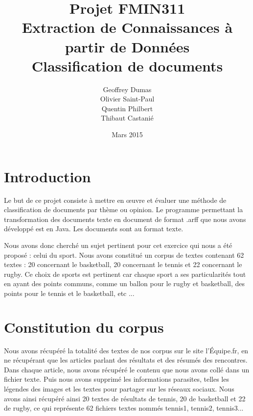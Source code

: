\documentclass[a4paper,11pt]{article}
\begin{document}
\title{Projet FMIN311\\Extraction de Connaissances à partir de Données\\\textbf{Classification de documents}}
\author{Geoffrey Dumas\\Olivier Saint-Paul\\Quentin Philbert\\Thibaut Castanié}
\date{Mars 2015}

\maketitle
\thispagestyle{empty}

\newpage


\setcounter{page}{1}
\tableofcontents

\newpage

\section{Introduction}
Le but de ce projet consiste à mettre en œuvre et évaluer une méthode de classification de documents par thème ou opinion. Le programme  permettant la transformation des documents texte en document de format .arff que nous avons développé est en Java. Les documents sont au format texte.

Nous avons donc cherché un sujet pertinent pour cet exercice qui nous a été proposé : celui du sport. Nous avons constitué un corpus de textes contenant 62 textes : 20 concernant le basketball, 20 concernant le tennis et 22 concernant le rugby. Ce choix de sports est pertinent car chaque sport a ses particularités tout en ayant des points communs, comme un ballon pour le rugby et basketball, des points pour le tennis et le basketball, etc ...

\newpage

\section{Constitution du corpus}
Nous avons récupéré la totalité des textes de nos corpus sur le site l’Équipe.fr, en ne récupérant que les articles parlant des résultats et des résumés des rencontres. Dans chaque article, nous avons récupéré le contenu que nous avons collé dans un fichier texte. Puis nous avons supprimé les informations parasites, telles les légendes des images et les textes pour partager sur les réseaux sociaux. Nous avons ainsi récupéré ainsi 20 textes de résultats de tennis, 20 de basketball et 22 de rugby, ce qui représente 62 fichiers textes nommés tennis1, tennis2, tennis3...
\end{document}
